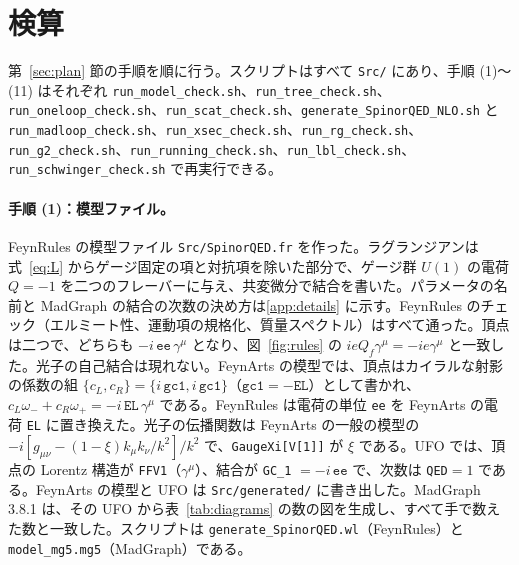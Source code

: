 \documentclass[a4paper,10pt]{ltjsarticle}
\begin{document}
\section{検算}\label{sec:checks}

第~\ref{sec:plan} 節の手順を順に行う。スクリプトはすべて \texttt{Src/} にあり、手順 (1)〜(11) はそれぞれ \texttt{run\_model\_check.sh}、\texttt{run\_tree\_check.sh}、\texttt{run\_oneloop\_check.sh}、\texttt{run\_scat\_check.sh}、\texttt{generate\_SpinorQED\_NLO.sh} と \texttt{run\_madloop\_check.sh}、\texttt{run\_xsec\_check.sh}、\texttt{run\_rg\_check.sh}、\texttt{run\_g2\_check.sh}、\texttt{run\_running\_check.sh}、\texttt{run\_lbl\_check.sh}、\texttt{run\_schwinger\_check.sh} で再実行できる。

\paragraph{手順 (1)：模型ファイル。}FeynRules の模型ファイル \texttt{Src/SpinorQED.fr} を作った。ラグランジアンは式~\eqref{eq:L} からゲージ固定の項と対抗項を除いた部分で、ゲージ群 $U(1)$ の電荷 $Q=-1$ を二つのフレーバーに与え、共変微分で結合を書いた。パラメータの名前と MadGraph の結合の次数の決め方は\ref{app:details} に示す。FeynRules のチェック（エルミート性、運動項の規格化、質量スペクトル）はすべて通った。頂点は二つで、どちらも $-i\,\texttt{ee}\,\gamma^\mu$ となり、図~\ref{fig:rules} の $ieQ_f\gamma^\mu=-ie\gamma^\mu$ と一致した。光子の自己結合は現れない。FeynArts の模型では、頂点はカイラルな射影の係数の組 $\{c_L,c_R\}=\{i\,\texttt{gc1},i\,\texttt{gc1}\}$（$\texttt{gc1}=-\texttt{EL}$）として書かれ、$c_L\omega_-+c_R\omega_+=-i\,\texttt{EL}\,\gamma^\mu$ である。FeynRules は電荷の単位 \texttt{ee} を FeynArts の電荷 \texttt{EL} に置き換えた。光子の伝播関数は FeynArts の一般の模型の $-i[g_{\mu\nu}-(1-\xi)k_\mu k_\nu/k^2]/k^2$ で、\texttt{GaugeXi[V[1]]} が $\xi$ である。UFO では、頂点の Lorentz 構造が \texttt{FFV1}（$\gamma^\mu$）、結合が \texttt{GC\_1} $=-i\,\texttt{ee}$ で、次数は \texttt{QED}$=1$ である。FeynArts の模型と UFO は \texttt{Src/generated/} に書き出した。MadGraph 3.8.1 は、その UFO から表~\ref{tab:diagrams} の数の図を生成し、すべて手で数えた数と一致した。スクリプトは \texttt{generate\_SpinorQED.wl}（FeynRules）と \texttt{model\_mg5.mg5}（MadGraph）である。
\end{document}
